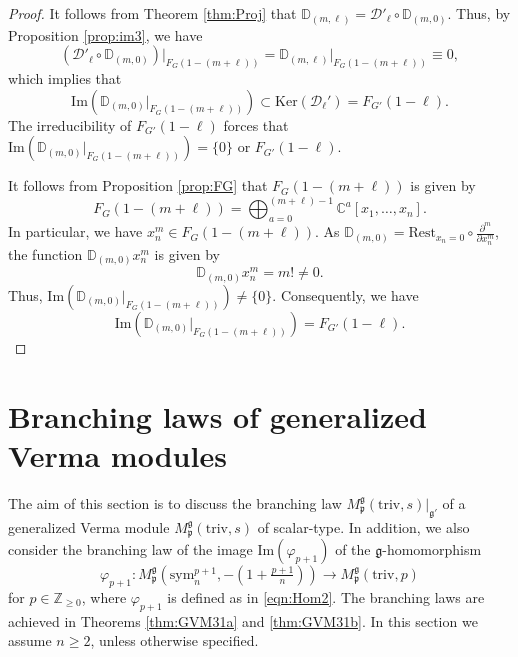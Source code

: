 \documentclass[reqno,11pt]{amsart}
\theoremstyle{remark}
\theoremstyle{definition}
\numberwithin{equation}{section}
\newcommand{\fg}{{\mathfrak g}}
\newcommand{\fp}{{\mathfrak p}}
\newcommand{\C}{\mathbb{C}}
\newcommand{\Z}{\mathbb{Z}}
\newcommand{\Cal}{\mathcal}
\renewcommand{\Im}{\mathrm{Im}}
\newcommand{\triv}{\mathrm{triv}}
\newcommand{\sym}{\mathrm{sym}}
\newcommand{\Ker}{\mathrm{Ker}}
\newcommand{\Mp}{M^{\fg}_{\fp}}
\newcommand{\Rest}{\mathrm{Rest}}
\newcommand{\D}{\Cal{D}}
\newcommand{\bD}{\mathbb{D}}
\begin{document}
\begin{proof}
It follows from Theorem \ref{thm:Proj} that
$\bD_{(m,\ell)} 
= \D'_\ell \circ \bD_{(m,0)}$.
Thus, by Proposition \ref{prop:im3}, we have
\begin{equation*}
(\D'_\ell \circ \bD_{(m,0)}) \vert_{F_{G}(1-(m+\ell))}
=\bD_{(m,\ell)}\vert_{F_{G}(1-(m+\ell))}
\equiv 0,
\end{equation*}
which implies that 
\begin{equation*}
\Im(\bD_{(m,0)}\vert_{F_{G}(1-(m+\ell))}) \subset \Ker(\D_\ell')=F_{G'}(1-\ell).
\end{equation*}
The irreducibility of $F_{G'}(1-\ell)$ forces that 
$\Im(\bD_{(m,0)}\vert_{F_{G}(1-(m+\ell))})
=\{0\}$  or $F_{G'}(1-\ell)$. 

It follows from Proposition \ref{prop:FG} that 
$F_G(1-(m+\ell))$ is given by
\begin{equation*}
F_G(1-(m+\ell)) = 
\bigoplus_{a=0}^{(m+\ell)-1}\C^a[x_1, \ldots, x_n].
\end{equation*}
In particular, we have $x^m_n \in F_G(1-(m+\ell))$. 
As $\bD_{(m,0)} = \Rest_{x_n=0}\circ \tfrac{\partial^m}{\partial x_n^m}$,
the function $\bD_{(m,0)} x_n^m$ is given by
\begin{equation*}
\bD_{(m,0)} x_n^m = m! \neq 0.
\end{equation*}
Thus, $\Im(\bD_{(m,0)}\vert_{F_{G}(1-(m+\ell))}) \neq \{0\}$. 
Consequently, we have 
\begin{equation*}
\Im(\bD_{(m,0)}\vert_{F_{G}(1-(m+\ell))}) = F_{G'}(1-\ell). %
\end{equation*}
\end{proof}

\section{Branching laws of generalized Verma modules}
\label{sec:GVM}

The aim of this section is to discuss the branching law
$\Mp(\triv,s)\vert_{\fg'}$ of a generalized Verma module
$\Mp(\triv,s)$ of scalar-type. In addition, we also consider 
the branching law of the image 
$\Im(\varphi_{p+1})$ of the $\fg$-homomorphism
\begin{equation}\label{eqn:GVMp}
\varphi_{p+1}\colon 
\Mp(\sym_n^{p+1},-(1+\tfrac{p+1}{n})) \to \Mp(\triv, p)
\end{equation}
for $p \in \Z_{\geq 0}$, 
where $\varphi_{p+1}$ is defined as in \eqref{eqn:Hom2}.
The branching laws are achieved in Theorems \ref{thm:GVM31a} 
and \ref{thm:GVM31b}.
In this section we assume $n \geq 2$, unless otherwise specified.
\end{document}
